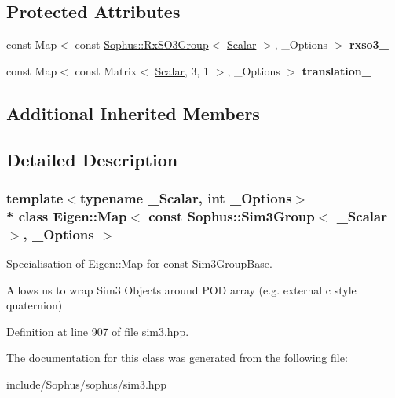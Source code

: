 \subsection*{Protected Attributes}
\begin{DoxyCompactItemize}
\item 
const Map$<$ const \hyperlink{class_sophus_1_1_rx_s_o3_group}{Sophus\+::\+Rx\+S\+O3\+Group}$<$ \hyperlink{class_eigen_1_1_map_3_01const_01_sophus_1_1_sim3_group_3_01___scalar_01_4_00_01___options_01_4_af8769c2970043ae3c4a88ced33b421a9}{Scalar} $>$, \+\_\+\+Options $>$ {\bfseries rxso3\+\_\+}\hypertarget{class_eigen_1_1_map_3_01const_01_sophus_1_1_sim3_group_3_01___scalar_01_4_00_01___options_01_4_a3e94c69dc33346a9a192a0eb61bae25b}{}\label{class_eigen_1_1_map_3_01const_01_sophus_1_1_sim3_group_3_01___scalar_01_4_00_01___options_01_4_a3e94c69dc33346a9a192a0eb61bae25b}

\item 
const Map$<$ const Matrix$<$ \hyperlink{class_eigen_1_1_map_3_01const_01_sophus_1_1_sim3_group_3_01___scalar_01_4_00_01___options_01_4_af8769c2970043ae3c4a88ced33b421a9}{Scalar}, 3, 1 $>$, \+\_\+\+Options $>$ {\bfseries translation\+\_\+}\hypertarget{class_eigen_1_1_map_3_01const_01_sophus_1_1_sim3_group_3_01___scalar_01_4_00_01___options_01_4_afb007fc2f029429b11758fc8b4ae078a}{}\label{class_eigen_1_1_map_3_01const_01_sophus_1_1_sim3_group_3_01___scalar_01_4_00_01___options_01_4_afb007fc2f029429b11758fc8b4ae078a}

\end{DoxyCompactItemize}
\subsection*{Additional Inherited Members}


\subsection{Detailed Description}
\subsubsection*{template$<$typename \+\_\+\+Scalar, int \+\_\+\+Options$>$\\*
class Eigen\+::\+Map$<$ const Sophus\+::\+Sim3\+Group$<$ \+\_\+\+Scalar $>$, \+\_\+\+Options $>$}

Specialisation of Eigen\+::\+Map for const Sim3\+Group\+Base. 

Allows us to wrap Sim3 Objects around P\+OD array (e.\+g. external c style quaternion) 

Definition at line 907 of file sim3.\+hpp.



The documentation for this class was generated from the following file\+:\begin{DoxyCompactItemize}
\item 
include/\+Sophus/sophus/sim3.\+hpp\end{DoxyCompactItemize}
